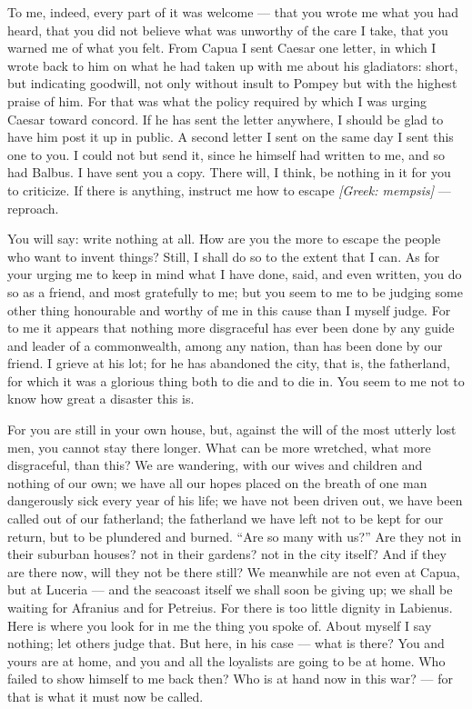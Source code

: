 

 To me, indeed, every part of it was welcome --- that you wrote me what you had heard, that you did not believe what was unworthy of the care I take, that you warned me of what you felt. From Capua I sent Caesar one letter, in which I wrote back to him on what he had taken up with me about his gladiators: short, but indicating goodwill, not only without insult to Pompey but with the highest praise of him. For that was what the policy required by which I was urging Caesar toward concord. If he has sent the letter anywhere, I should be glad to have him post it up in public. A second letter I sent on the same day I sent this one to you. I could not but send it, since he himself had written to me, and so had Balbus. I have sent you a copy. There will, I think, be nothing in it for you to criticize. If there is anything, instruct me how to escape \textit{[Greek: mempsis]} --- reproach.

 You will say: write nothing at all. How are you the more to escape the people who want to invent things? Still, I shall do so to the extent that I can. As for your urging me to keep in mind what I have done, said, and even written, you do so as a friend, and most gratefully to me; but you seem to me to be judging some other thing honourable and worthy of me in this cause than I myself judge. For to me it appears that nothing more disgraceful has ever been done by any guide and leader of a commonwealth, among any nation, than has been done by our friend. I grieve at his lot; for he has abandoned the city, that is, the fatherland, for which it was a glorious thing both to die and to die in. You seem to me not to know how great a disaster this is.

 For you are still in your own house, but, against the will of the most utterly lost men, you cannot stay there longer. What can be more wretched, what more disgraceful, than this? We are wandering, with our wives and children and nothing of our own; we have all our hopes placed on the breath of one man dangerously sick every year of his life; we have not been driven out, we have been called out of our fatherland; the fatherland we have left not to be kept for our return, but to be plundered and burned. ``Are so many with us?'' Are they not in their suburban houses? not in their gardens? not in the city itself? And if they are there now, will they not be there still? We meanwhile are not even at Capua, but at Luceria --- and the seacoast itself we shall soon be giving up; we shall be waiting for Afranius and for Petreius. For there is too little dignity in Labienus. Here is where you look for in me the thing you spoke of. About myself I say nothing; let others judge that. But here, in his case --- what is there? You and yours are at home, and you and all the loyalists are going to be at home. Who failed to show himself to me back then? Who is at hand now in this war? --- for that is what it must now be called.

